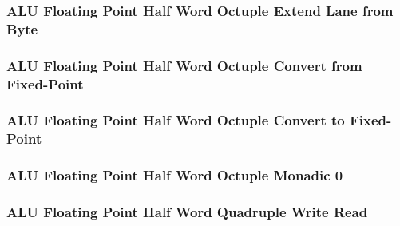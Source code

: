 \subsubsection[{\small ALU Floating Point Half Word Octuple Extend Lane from Byte}]{ALU Floating Point Half Word Octuple Extend Lane from Byte} \label{sec:format-ALU-FHOEXTLWR}



\subsubsection[{\small ALU Floating Point Half Word Octuple Convert from Fixed-Point}]{ALU Floating Point Half Word Octuple Convert from Fixed-Point} \label{sec:format-ALU-FHOFLOAT}



\subsubsection[{\small ALU Floating Point Half Word Octuple Convert to Fixed-Point}]{ALU Floating Point Half Word Octuple Convert to Fixed-Point} \label{sec:format-ALU-FHOFIXED}



\subsubsection[{\small ALU Floating Point Half Word Octuple Monadic 0}]{ALU Floating Point Half Word Octuple Monadic 0} \label{sec:format-ALU-FHOMO0}



\subsubsection[{\small ALU Floating Point Half Word Quadruple Write Read}]{ALU Floating Point Half Word Quadruple Write Read} \label{sec:format-ALU-FHQWR}



